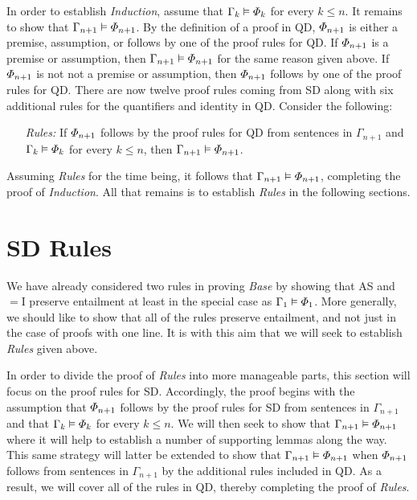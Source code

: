 In order to establish \textit{Induction}, assume that $\Gamma_k \vDash \varPhi_k$ for every $k\leq n$. 
It remains to show that $\Gamma_{n+1} \vDash \varPhi_{n+1}$.
By the definition of a proof in QD, $\varPhi_{n+1}$ is either a premise, assumption, or follows by one of the proof rules for QD. 
If $\varPhi_{n+1}$ is a premise or assumption, then $\Gamma_{n+1} \vDash \varPhi_{n+1}$ for the same reason given above.
If $\varPhi_{n+1}$ is not not a premise or assumption, then $\varPhi_{n+1}$ follows by one of the proof rules for QD. 
There are now twelve proof rules coming from SD along with six additional rules for the quantifiers and identity in QD.
Consider the following:
\begin{enumerate}[leftmargin=1.5in]
  \item[\it Rules:] If $\varPhi_{n+1}$ follows by the proof rules for QD from sentences in $\Gamma_{n+1}$ and $\Gamma_k \vDash \varPhi_k$ for every $k\leq n$, then $\Gamma_{n+1} \vDash \varPhi_{n+1}$.
\end{enumerate}
Assuming \textit{Rules} for the time being, it follows that $\Gamma_{n+1} \vDash \varPhi_{n+1}$, completing the proof of \textit{Induction}.
All that remains is to establish \textit{Rules} in the following sections.





\section{SD Rules}%
  \label{sec:SDRules}

We have already considered two rules in proving \textit{Base} by showing that AS and $=$I preserve entailment at least in the special case as $\Gamma_1 \vDash \varPhi_1$.
More generally, we should like to show that all of the rules preserve entailment, and not just in the case of proofs with one line.
It is with this aim that we will seek to establish \textit{Rules} given above.

In order to divide the proof of \textit{Rules} into more manageable parts, this section will focus on the proof rules for SD. 
Accordingly, the proof begins with the assumption that $\varPhi_{n+1}$ follows by the proof rules for SD from sentences in $\Gamma_{n+1}$ and that $\Gamma_k \vDash \varPhi_k$ for every $k\leq n$.
We will then seek to show that $\Gamma_{n+1} \vDash \varPhi_{n+1}$ where it will help to establish a number of supporting lemmas along the way.
This same strategy will latter be extended to show that $\Gamma_{n+1} \vDash \varPhi_{n+1}$ when $\varPhi_{n+1}$ follows from sentences in $\Gamma_{n+1}$ by the additional rules included in QD.
As a result, we will cover all of the rules in QD, thereby completing the proof of \textit{Rules}.






